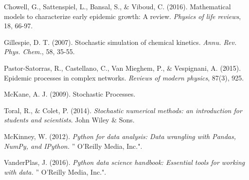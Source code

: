 
\begin{thebibliography}{999}

Chowell, G., Sattenspiel, L., Bansal, S., $\&$ Viboud, C. (2016). 
Mathematical models to characterize early epidemic growth: A review. \textit{Physics of life reviews}, 18, 66-97.

 Gillespie, D. T. (2007).
Stochastic simulation of chemical kinetics. \textit{Annu. Rev. Phys. Chem.}, 58, 35-55.

 Pastor-Satorras, R., Castellano, C., Van Mieghem, P., $\&$ Vespignani, A. (2015).
Epidemic processes in complex networks. \textit{Reviews of modern physics}, 87(3), 925.

 McKane, A. J. (2009). Stochastic Processes.

 Toral, R., $\&$ Colet, P. (2014). \textit{Stochastic numerical methods: an introduction for students and scientists}.
John Wiley $\&$ Sons.

 McKinney, W. (2012). \textit{Python for data analysis: Data wrangling with Pandas, NumPy, and IPython.} '' O'Reilly Media, Inc.".

 VanderPlas, J. (2016). \textit{Python data science handbook: Essential tools for working with data.} '' O'Reilly Media, Inc.".

\end{thebibliography}